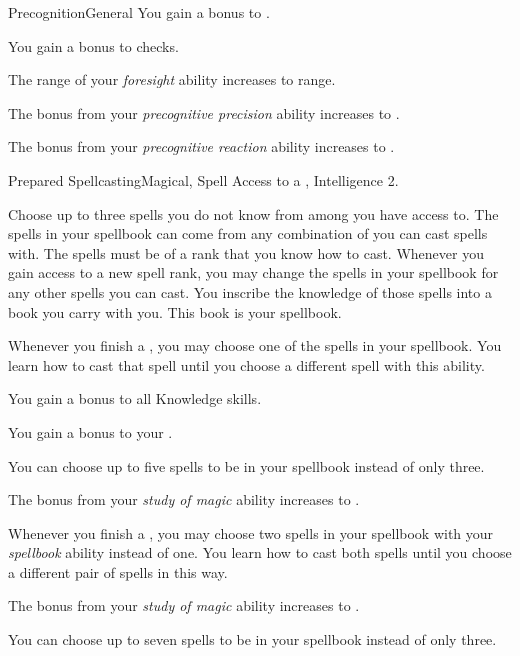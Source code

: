 \begin{feat}{Precognition}{General}
         You gain a  bonus to .

         You gain a  bonus to  checks.

         The range of your \textit{foresight} ability increases to \rnglong range.

         The bonus from your \textit{precognitive precision} ability increases to .

         The bonus from your \textit{precognitive reaction} ability increases to .
    \end{feat}

    \begin{feat}{Prepared Spellcasting}{Magical, Spell}
        \featpre Access to a , Intelligence 2.

         Choose up to three spells you do not know from among  you have access to.
        The spells in your spellbook can come from any combination of  you can cast spells with.
        The spells must be of a rank that you know how to cast.
        Whenever you gain access to a new spell rank, you may change the spells in your spellbook for any other spells you can cast.
        You inscribe the knowledge of those spells into a book you carry with you.
        This book is your spellbook.
        
        Whenever you finish a , you may choose one of the spells in your spellbook.
        You learn how to cast that spell until you choose a different spell with this ability.

         You gain a  bonus to all Knowledge skills.

         You gain a  bonus to your .

         You can choose up to five spells to be in your spellbook instead of only three.

         The bonus from your \textit{study of magic} ability increases to .

         Whenever you finish a , you may choose two spells in your spellbook with your \textit{spellbook} ability instead of one.
        You learn how to cast both spells until you choose a different pair of spells in this way.

         The bonus from your \textit{study of magic} ability increases to .

         You can choose up to seven spells to be in your spellbook instead of only three.
    \end{feat}

